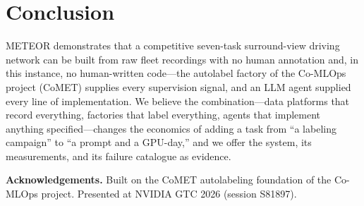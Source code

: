 \documentclass[10pt,twocolumn]{article}
\newcommand{\meteor}{METEOR}
\begin{document}
\section{Conclusion}
\meteor{} demonstrates that a competitive seven-task surround-view driving
network can be built from raw fleet recordings with no human annotation and,
in this instance, no human-written code---the autolabel factory of the
Co-MLOps project (CoMET) supplies every supervision signal, and an LLM agent
supplied every line of implementation. We believe the combination---data
platforms that record everything, factories that label everything, agents
that implement anything specified---changes the economics of adding a task
from ``a labeling campaign'' to ``a prompt and a GPU-day,'' and we offer the
system, its measurements, and its failure catalogue as evidence.

\medskip
\noindent\textbf{Acknowledgements.} Built on the CoMET autolabeling
foundation of the Co-MLOps project. Presented at NVIDIA GTC 2026 (session
S81897).
\end{document}
